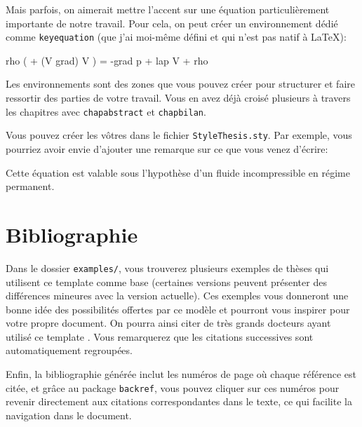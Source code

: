 Mais parfois, on aimerait mettre l'accent sur une équation particulièrement importante de notre travail. Pour cela, on peut créer un environnement dédié comme \texttt{keyequation} (que j'ai moi-même défini et qui n'est pas natif à \LaTeX):

\begin{keyequation}
    \gls{rho} \left(  
    + (\gls{V} \cdot \gls{grad}) \gls{V} \right)
    = -\gls{grad} p + \mu \gls{lap} \gls{V} + \gls{rho} 
\end{keyequation}

Les environnements sont des zones que vous pouvez créer pour structurer et faire ressortir des parties de votre travail. Vous en avez déjà croisé plusieurs à travers les chapitres avec \texttt{chapabstract} et \texttt{chapbilan}.

Vous pouvez créer les vôtres dans le fichier \texttt{StyleThesis.sty}. Par exemple, vous pourriez avoir envie d'ajouter une remarque sur ce que vous venez d'écrire:

\begin{remarque}
    Cette équation est valable sous l'hypothèse d'un fluide incompressible en régime permanent.
\end{remarque}

\section{Bibliographie}\label{Annexe_A:Bibliographie}

Dans le dossier \texttt{examples/}, vous trouverez plusieurs exemples de thèses qui utilisent ce template comme base (certaines versions peuvent présenter des différences mineures avec la version actuelle). Ces exemples vous donneront une bonne idée des possibilités offertes par ce modèle et pourront vous inspirer pour votre propre document. On pourra ainsi citer de très grands docteurs ayant utilisé ce template \cite{camberlin_simulation_2025,desmolin_amelioration_2025,prieto_etude_2025,rouviere_amelioration_2023,ledent_etude_2025}. Vous remarquerez que les citations successives sont automatiquement regroupées.

Enfin, la bibliographie générée inclut les numéros de page où chaque référence est citée, et grâce au package \texttt{backref}, vous pouvez cliquer sur ces numéros pour revenir directement aux citations correspondantes dans le texte, ce qui facilite la navigation dans le document.

